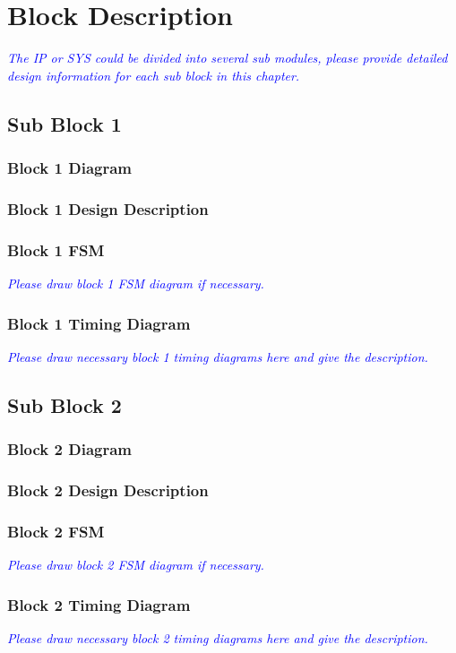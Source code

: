 
\clearpage

\section{Block Description}
\noindent\textit{\small\textcolor{blue}{The IP or SYS could be divided into several sub modules, please provide detailed design information for each sub block in this chapter.}}

\subsection{Sub Block 1}

\subsubsection{Block 1 Diagram}
\subsubsection{Block 1 Design Description}
\subsubsection{Block 1 FSM}
\noindent\textit{\small\textcolor{blue}{Please draw block 1 FSM diagram if necessary.}}
\subsubsection{Block 1 Timing Diagram}
\noindent\textit{\small\textcolor{blue}{Please draw necessary block 1 timing diagrams here and give the description.}}

\subsection{Sub Block 2}
\subsubsection{Block 2 Diagram}
\subsubsection{Block 2 Design Description}
\subsubsection{Block 2 FSM}
\noindent\textit{\small\textcolor{blue}{Please draw block 2 FSM diagram if necessary.}}
\subsubsection{Block 2 Timing Diagram}
\noindent\textit{\small\textcolor{blue}{Please draw necessary block 2 timing diagrams here and give the description.}}
